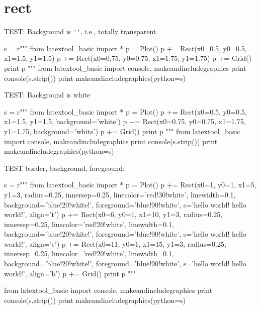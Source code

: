 \section{rect}


TEST: Background is \verb!''!, i.e., totally transparent.
\begin{python}
s = r"""
from latextool_basic import *
p = Plot()
p += Rect(x0=0.5, y0=0.5, x1=1.5, y1=1.5)
p += Rect(x0=0.75, y0=0.75, x1=1.75, y1=1.75)
p += Grid()
print p
"""
from latextool_basic import console, makeandincludegraphics
print console(s.strip())
print makeandincludegraphics(python=s)
\end{python}




TEST: Background is white
\begin{python}
s = r"""
from latextool_basic import *
p = Plot()
p += Rect(x0=0.5, y0=0.5, x1=1.5, y1=1.5, background='white')
p += Rect(x0=0.75, y0=0.75, x1=1.75, y1=1.75, background='white')
p += Grid()
print p
"""
from latextool_basic import console, makeandincludegraphics
print console(s.strip())
print makeandincludegraphics(python=s)
\end{python}




TEST border, background, foreground:
\begin{python}
s = r"""
from latextool_basic import *
p = Plot()
p += Rect(x0=1, y0=1, x1=5, y1=3,
          radius=0.25, innersep=0.25,
          linecolor='red!30!white', linewidth=0.1,
          background='blue!20!white!', foreground='blue!90!white', 
          s='hello world! hello world!', align='t')
p += Rect(x0=6, y0=1, x1=10, y1=3,
          radius=0.25, innersep=0.25,
          linecolor='red!20!white', linewidth=0.1,
          background='blue!20!white!', foreground='blue!90!white', 
          s='hello world! hello world!', align='c')
p += Rect(x0=11, y0=1, x1=15, y1=3,
          radius=0.25, innersep=0.25,
          linecolor='red!20!white', linewidth=0.1,
          background='blue!20!white!', foreground='blue!90!white', 
          s='hello world! hello world!', align='b')
p += Grid()
print p
"""

from latextool_basic import console, makeandincludegraphics
print console(s.strip())
print makeandincludegraphics(python=s)
\end{python}

